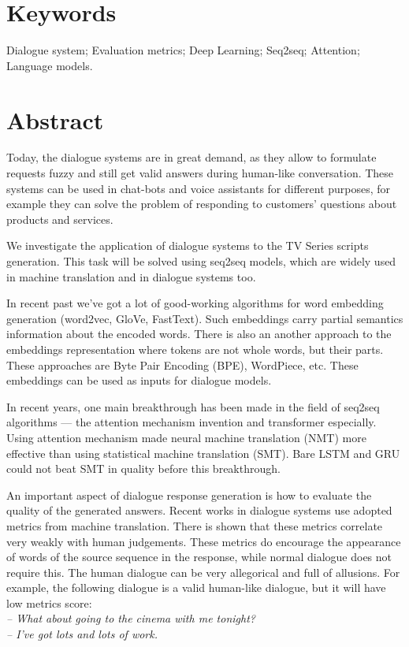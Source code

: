 \documentclass{article}
\begin{document}
\setcounter{page}{2}
\section{Keywords}
Dialogue system; Evaluation metrics; Deep Learning; Seq2seq; Attention; Language models.
\section{Abstract}
\begin{multicols}{2}
% 
% 
Today, the dialogue systems are in great demand, as they allow to formulate requests fuzzy and still get valid answers during human-like conversation.
These systems can be used in chat-bots and voice assistants for different purposes, for example they can solve the problem of responding to customers' questions about products and services.

We investigate the application of dialogue systems to the TV Series scripts generation. This task will be solved using seq2seq models, which are widely used in machine translation and in dialogue systems too.

In recent past we've got a lot of good-working algorithms for word embedding generation (word2vec\cite{w2v}, GloVe\cite{pennington-etal-2014-glove}, FastText\cite{fast-text}). Such embeddings carry partial semantics information about the encoded words.
There is also an another approach to the embeddings representation where tokens are not whole words, but their parts. These approaches are Byte Pair Encoding (BPE), WordPiece, etc. 
These embeddings can be used as inputs for dialogue models.

In recent years, one main breakthrough has been made in the field of seq2seq algorithms --- the attention mechanism invention and transformer especially.
Using attention mechanism made neural machine translation (NMT) more effective than using statistical machine translation (SMT)\cite{transformer}.
Bare LSTM and GRU could not beat SMT in quality before this breakthrough.

An important aspect of dialogue response generation is how to evaluate the quality of the generated answers.
Recent works in dialogue systems use adopted metrics from machine translation.
There is shown\cite{how_not_to_evaluate} that these metrics correlate very weakly with human judgements.
These metrics do encourage the appearance of words of the source sequence in the response, while normal dialogue does not require this.
    The human dialogue can be very allegorical and full of allusions. For example, the following dialogue is a valid human-like dialogue, but it will have low metrics score:\\
\textit{-- What about going to the cinema with me tonight?}\\
\textit{-- I've got lots and lots of work.}
\vspace{1em}


\end{multicols}
\end{document}
